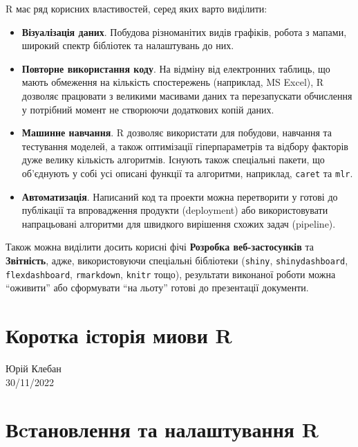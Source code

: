 \documentclass[
  letterpaper,
  DIV=11,
  numbers=noendperiod]{scrreprt}
\begin{document}
R має ряд корисних властивостей, серед яких варто виділити:

\begin{itemize}
\item
  \textbf{Візуалізація даних}. Побудова різноманітих видів графіків,
  робота з мапами, широкий спектр бібліотек та налаштувань до них.
\item
  \textbf{Повторне використання коду}. На відміну від електронних
  таблиць, що мають обмеження на кількість спостережень (наприклад, MS
  Excel), R дозволяє працювати з великими масивами даних та
  перезапускати обчислення у потрібний момент не створюючи додаткових
  копій даних.
\item
  \textbf{Машинне навчання}. R дозволяє використати для побудови,
  навчання та тестування моделей, а також оптимізації гіперпараметрів та
  відбору факторів дуже велику кількість алгоритмів. Існують також
  спеціальні пакети, що об'єднують у собі усі описані функції та
  алгоритми, наприклад, \texttt{caret} та \texttt{mlr}.
\item
  \textbf{Автоматизація}. Написаний код та проекти можна перетворити у
  готові до публікації та впровадження продукти (deployment) або
  використовувати напрацьовані алгоритми для швидкого вирішення схожих
  задач (pipeline).
\end{itemize}

Також можна виділити досить корисні фічі \textbf{Розробка
веб-застосунків} та \textbf{Звітність}, адже, використовуючи спеціальні
бібліотеки (\texttt{shiny}, \texttt{shinydashboard},
\texttt{flexdashboard}, \texttt{rmarkdown}, \texttt{knitr} тощо),
результати виконаної роботи можна ``оживити'' або сформувати ``на
льоту'' готові до презентації документи.

\hypertarget{ux43aux43eux440ux43eux442ux43aux430-ux456ux441ux442ux43eux440ux456ux44f-ux43cux438ux43eux432ux438-r}{%
\chapter{Коротка історія миови
R}\label{ux43aux43eux440ux43eux442ux43aux430-ux456ux441ux442ux43eux440ux456ux44f-ux43cux438ux43eux432ux438-r}}

Юрій Клебан\\
30/11/2022

\hfill\break

\hypertarget{ux432cux442ux430ux43dux43eux432ux43bux435ux43dux43dux44f-ux442ux430-ux43dux430ux43bux430ux448ux442ux443ux432ux430ux43dux43dux44f-r}{%
\chapter{Вcтановлення та налаштування
R}\label{ux432cux442ux430ux43dux43eux432ux43bux435ux43dux43dux44f-ux442ux430-ux43dux430ux43bux430ux448ux442ux443ux432ux430ux43dux43dux44f-r}}
\end{document}
